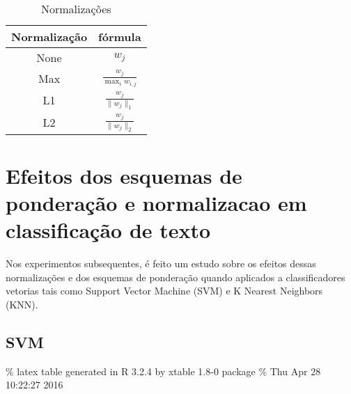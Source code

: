 \documentclass[]{article}
\begin{document}
\begin{table}[ht]
\centering
\begin{tabular}{|cc|}
\hline
  Normalização & fórmula\\ 
\hline
None & $w_j$\\
Max & $\frac{w_j}{\max_i w_{i,j}}$\\
L1 & $\frac{w_j}{\|w_{j}\|_1}$\\
L2 & $\frac{w_j}{\|w_{j}\|_2}$\\
\hline
\end{tabular}
\caption{Normalizações}
\label{tab:norms}
\end{table}

\section{Efeitos dos esquemas de ponderação e normalizacao em
classificação de
texto}\label{efeitos-dos-esquemas-de-ponderacao-e-normalizacao-em-classificacao-de-texto}

Nos experimentos subsequentes, é feito um estudo sobre os efeitos dessas
normalizações e dos esquemas de ponderação quando aplicados a
classificadores vetorias tais como Support Vector Machine (SVM) e K
Nearest Neighbors (KNN).

\subsection{SVM}\label{svm-1}

\% latex table generated in R 3.2.4 by xtable 1.8-0 package \% Thu Apr
28 10:22:27 2016
\end{document}
